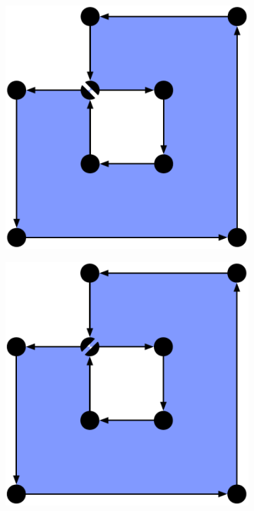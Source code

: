 \begin{figure}
\begin{subfigure}[b]{0.3\linewidth}
\includegraphics[width=\linewidth]{figs/nonmanifold-1}
\caption{}%
\label{subfig:nonmanifold-1}
\end{subfigure}
\quad
\begin{subfigure}[b]{0.3\linewidth}
\includegraphics[width=\linewidth]{figs/nonmanifold-2}

\end{subfigure}
\end{figure}
